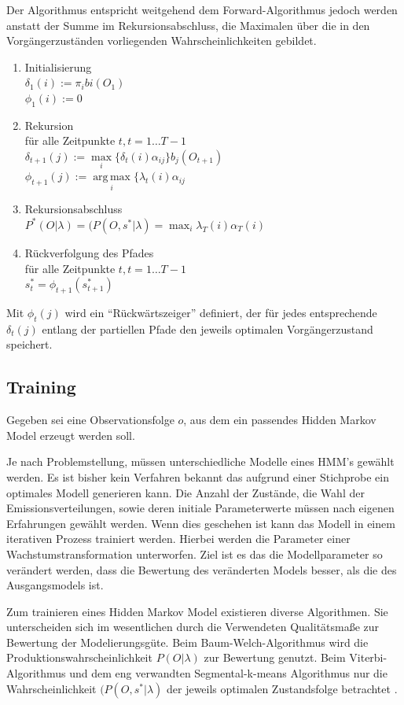 Der Algorithmus entspricht weitgehend dem Forward-Algorithmus jedoch werden anstatt der Summe im Rekursionsabschluss, die Maximalen über die in den Vorgängerzuständen vorliegenden Wahrscheinlichkeiten gebildet.
\begin{enumerate}
  \item Initialisierung\\
		\(\delta_{1}(i) := \pi_{i}b{i}(O_{1})\)\\
		\(\phi_{1}(i):=0\)
  \item Rekursion\\
	für alle Zeitpunkte \(t, t=1 \ldots T-1\)\\
	\(\delta_{t+1}(j) :=
	\max\limits_{i}\{\delta_{t}(i)\alpha_{ij}\}b_{j}(O_{t+1})\)\\
	\(\phi_{t+1}(j):= \operatorname{arg\,max}\limits_{i}\{\lambda_{t}(i)\alpha_{ij} \)
  \item Rekursionsabschluss\\
  	\(P^{*}(O|\lambda) = (P(O,s^{*}|\lambda) = \max_{i}\lambda_{T}(i)
  	\alpha_{T}(i)\)
  \item Rückverfolgung des Pfades\\
	für alle Zeitpunkte \(t, t=1 \ldots T-1\)\\
	\(s_{t}^{*}=\phi_{t+1}(s_{t+1}^{*})\)
\end{enumerate}
Mit $\phi_{t}(j)$ wird ein ``Rückwärtszeiger'' definiert, der für jedes
entsprechende $\delta_{t}(j)$ entlang der partiellen Pfade den jeweils
optimalen Vorgängerzustand speichert.


\subsection{Training}
\label{sec:train}
Gegeben sei eine Observationsfolge $o$, aus dem ein passendes Hidden Markov Model erzeugt werden soll. 

Je nach Problemstellung, müssen unterschiedliche Modelle eines HMM's gewählt werden. Es ist bisher kein Verfahren bekannt das aufgrund einer Stichprobe ein optimales Modell generieren kann. Die Anzahl der Zustände, die Wahl der Emissionsverteilungen, sowie deren initiale Parameterwerte müssen nach eigenen Erfahrungen gewählt werden. Wenn dies geschehen ist kann das Modell in einem iterativen Prozess trainiert werden. Hierbei werden die Parameter einer Wachstumstransformation unterworfen. Ziel ist es das die Modellparameter so verändert werden, dass die Bewertung des veränderten Models besser, als die des Ausgangsmodels ist.

Zum trainieren eines Hidden Markov Model existieren diverse Algorithmen. Sie unterscheiden sich im wesentlichen durch die Verwendeten Qualitätsmaße zur Bewertung der Modelierungsgüte. Beim Baum-Welch-Algorithmus \cite{rabiner} wird die Produktionswahrscheinlichkeit \(P(O|\lambda)\) zur Bewertung genutzt. Beim Viterbi-Algorithmus \cite{viterbi} und dem eng verwandten Segmental-k-means Algorithmus \cite{juang} nur die Wahrscheinlichkeit \((P(O,s^{*}|\lambda)\) der jeweils optimalen Zustandsfolge betrachtet \cite{mmmFink}.
